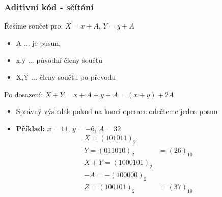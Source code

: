 	\begin{frame}
    \frametitle{Aditivní kód - sčítání}
    \boldmath
    \small
    Řešíme součet pro: $X = x + A$, $Y = y + A$
    
    \begin{itemize}
      \item A ... je pusun,
      \item x,y ... původní členy součtu
      \item X,Y ... členy součtu po převodu
    \end{itemize}
    \vspace{5mm}
    Po dosazení: $X + Y = x + A + y + A = (x + y) + 2A$
		\vspace{3mm}
    \begin{itemize}
      \item Správný výsledek pokud na konci operace odečteme jeden posun
      \item \textbf{Příklad:} $x = 11$, $y = -6$, $A = 32$
      \begin{align*}
        X = (101011)_2& \\
        Y = (011010)_2& = (26)_{10}\\
        X+Y = (1000101)_2& \\
        -A = -(100000)_2& \\
        Z = (100101)_2& = (37)_{10}
      \end{align*}
    \end{itemize}
	\end{frame}

